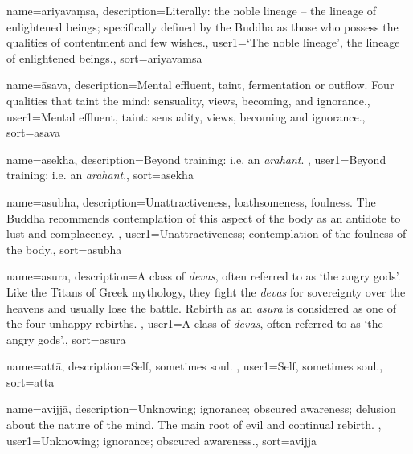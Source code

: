 {
name=ariyava\d{m}sa,
description={Literally: the noble lineage -- the lineage of enlightened beings; specifically defined by the Buddha as those who possess the qualities of contentment and few wishes.},
user1={`The noble lineage', the lineage of enlightened beings.},
sort={ariyavamsa}
}

{
name={\=asava},
description={Mental effluent, taint, fermentation or outflow. Four qualities that taint the mind: sensuality, views, becoming, and ignorance.},
user1={Mental effluent, taint: sensuality, views, becoming and ignorance.},
sort={asava}
}

{
name=asekha,
description={Beyond training: i.e. an \textit{arahant}. \protect \seepre %
\protect {}%
\protect \seepost %
},
user1={Beyond training: i.e. an \textit{arahant}.},
sort={asekha}
}

{
name={asubha},
description={Unattractiveness, loathsomeness, foulness. The Buddha recommends contemplation of this aspect of the body as an antidote to lust and complacency. \protect \seepre %
\protect {}%
\protect \seepost %
},
user1={Unattractiveness; contemplation of the foulness of the body.},
sort={asubha}
}

{
name={asura},
description={A class of \textit{devas}, often referred to as `the angry gods'. Like the Titans of Greek mythology, they fight the \textit{devas} for sovereignty over the heavens and usually lose the battle. Rebirth as an \textit{asura} is considered as one of the four unhappy rebirths. \protect \seepre %
\protect {}%
\protect \seepost %
},
user1={A class of \textit{devas}, often referred to as `the angry gods'.},
sort={asura}
}

{
name=att\=a,
description={Self, sometimes soul. \protect \seepre %
\protect {}%
\protect \seepost %
},
user1={Self, sometimes soul.},
sort={atta}
}

{
name={avijj\=a},
description={Unknowing; ignorance; obscured awareness; delusion about the nature of the mind. The main root of evil and continual rebirth. \protect \seepre %
\protect {}%
\protect \seepost %
},
user1={Unknowing; ignorance; obscured awareness.},
sort={avijja}
}

